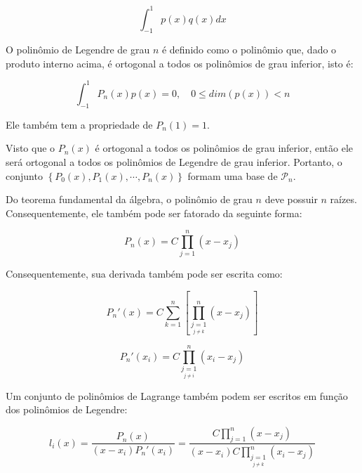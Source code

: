         \begin{equation}
            \int_{-1}^1 p(x) q(x) dx
        \end{equation}

        O polinômio de Legendre de grau $n$ é definido como o polinômio que, dado o produto interno acima, é ortogonal a todos os polinômios de grau inferior, isto é:

        \begin{equation}
            \int_{-1}^{1} P_n(x) p(x) = 0, \quad 0\leq dim(p(x)) <n
        \end{equation}

        Ele também tem a propriedade de $P_n(1) = 1$.

        Visto que o $P_n(x)$ é ortogonal a todos os polinômios de grau inferior, então ele será ortogonal a todos os polinômios de Legendre de grau inferior. Portanto, o conjunto $\left\{P_0(x), P_1(x), \cdots, P_n(x)\right\}$ formam uma base de $\mathcal{P}_n$.

        Do teorema fundamental da álgebra, o polinômio de grau $n$ deve possuir $n$ raízes. Consequentemente, ele também pode ser fatorado da seguinte forma:

        \begin{equation}
            P_n(x) = C \prod_{j=1}^n \left(x-x_j\right)
        \end{equation}

        Consequentemente, sua derivada também pode ser escrita como:

        \begin{equation}
            P_n'(x) = C \sum_{k=1}^n \left[\prod_{\underset{j \neq k}{j=1}}^n \left(x-x_j\right)\right]
        \end{equation}

        \begin{equation}
            P_n'(x_i) = C \prod_{\underset{j \neq i}{j=1}}^n \left(x_i-x_j\right)
        \end{equation}

        Um conjunto de polinômios de Lagrange também podem ser escritos em função dos polinômios de Legendre:

        \begin{equation}
            l_i(x) = \frac{P_n(x)}{\left(x-x_i\right)P_n'(x_i)} = 
            \frac{C \prod_{j=1}^n \left(x-x_j\right)}{\left(x-x_i\right)C \prod_{\underset{j \neq k}{j=1}}^n \left(x_i-x_j\right)}
        \end{equation}

